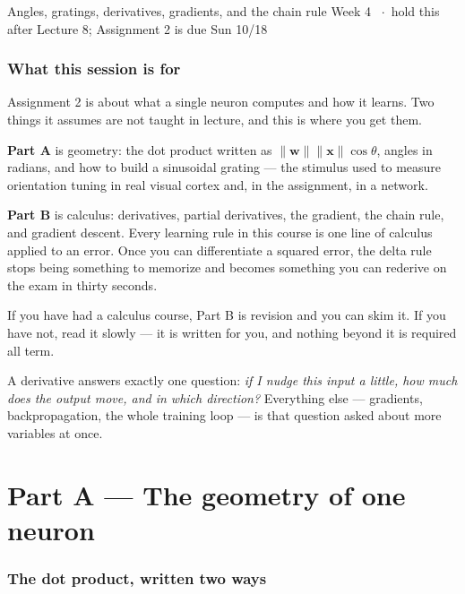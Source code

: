\documentclass[11pt]{article}
\begin{document}
  {Angles, gratings, derivatives, gradients, and the chain rule}
  {Week 4 \ $\cdot$\ hold this after Lecture 8; Assignment 2 is due Sun 10/18}

\section*{What this session is for}

Assignment 2 is about what a single neuron computes and how it learns. Two
things it assumes are not taught in lecture, and this is where you get them.

\textbf{Part A} is geometry: the dot product written as
$\|\boldsymbol{w}\|\|\boldsymbol{x}\|\cos\theta$, angles in radians, and how to
build a sinusoidal grating --- the stimulus used to measure orientation tuning in
real visual cortex and, in the assignment, in a network.

\textbf{Part B} is calculus: derivatives, partial derivatives, the gradient, the
chain rule, and gradient descent. Every learning rule in this course is one
line of calculus applied to an error. Once you can differentiate a squared
error, the delta rule stops being something to memorize and becomes something
you can rederive on the exam in thirty seconds.

If you have had a calculus course, Part B is revision and you can skim it. If
you have not, read it slowly --- it is written for you, and nothing beyond it is
required all term.

\begin{keybox}
 A derivative answers exactly one question: \emph{if I nudge
this input a little, how much does the output move, and in which direction?}
Everything else --- gradients, backpropagation, the whole training loop --- is that
question asked about more variables at once.
\end{keybox}

\part*{Part A --- The geometry of one neuron}

\section{The dot product, written two ways}
\end{document}
